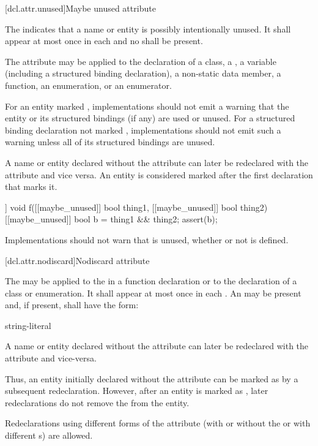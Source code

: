 [dcl.attr.unused]{Maybe unused attribute}%

\pnum
The  
indicates that a name or entity is possibly intentionally unused.
It shall appear at most once in each  and
no  shall be present.

\pnum
The attribute may be applied to the declaration of a class,
a ,
a variable (including a structured binding declaration),
a non-static data member,
a function, an enumeration, or an enumerator.

\pnum
For an entity marked ,
implementations should not emit a warning
that the entity or its structured bindings (if any)
are used or unused.
For a structured binding declaration not marked ,
implementations should not emit such a warning unless
all of its structured bindings are unused.

\pnum
A name or entity declared without the  attribute
can later be redeclared with the attribute
and vice versa.
An entity is considered marked
after the first declaration that marks it.

\pnum
\begin{example}
\begin{codeblock}
[[maybe_unused]] void f([[maybe_unused]] bool thing1,
                        [[maybe_unused]] bool thing2) {
  [[maybe_unused]] bool b = thing1 && thing2;
  assert(b);
}
\end{codeblock}
Implementations should not warn that  is unused,
whether or not  is defined.
\end{example}

[dcl.attr.nodiscard]{Nodiscard attribute}%

\pnum
The  
may be applied to the 
in a function declaration or to the declaration of a class or enumeration.
It shall appear at most once in each .
An  may be present
and, if present, shall have the form:

\begin{ncbnf}
\terminal{(} string-literal \terminal{)}
\end{ncbnf}

\pnum
A name or entity declared without the  attribute
can later be redeclared with the attribute and vice-versa.
\begin{note}
Thus, an entity initially declared without the attribute
can be marked as 
by a subsequent redeclaration.
However, after an entity is marked as ,
later redeclarations do not remove the 
from the entity.
\end{note}
Redeclarations using different forms of the attribute
(with or without the 
or with different s)
are allowed.


